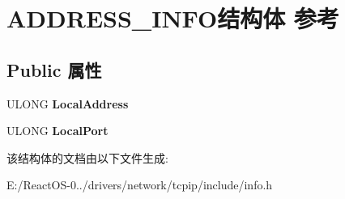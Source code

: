 \hypertarget{struct_a_d_d_r_e_s_s___i_n_f_o}{}\section{A\+D\+D\+R\+E\+S\+S\+\_\+\+I\+N\+F\+O结构体 参考}
\label{struct_a_d_d_r_e_s_s___i_n_f_o}
\subsection*{Public 属性}
\begin{DoxyCompactItemize}
\item 
\mbox{\label{struct_a_d_d_r_e_s_s___i_n_f_o_ae7298fc4780d661283dae33174c7b555}} 
U\+L\+O\+NG {\bfseries Local\+Address}
\item 
\mbox{\label{struct_a_d_d_r_e_s_s___i_n_f_o_a45b4f4a4ebd3320e85ce60d1eaae5d61}} 
U\+L\+O\+NG {\bfseries Local\+Port}
\end{DoxyCompactItemize}


该结构体的文档由以下文件生成\+:\begin{DoxyCompactItemize}
\item 
E\+:/\+React\+O\+S-\/0../drivers/network/tcpip/include/info.\+h\end{DoxyCompactItemize}
